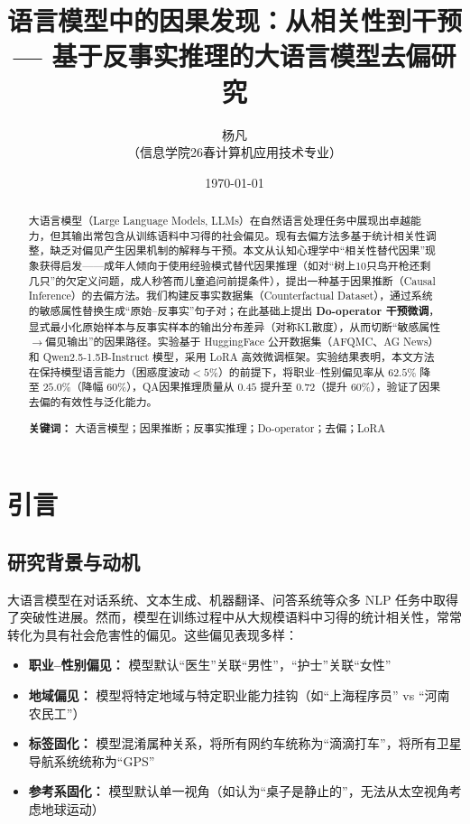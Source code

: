 \documentclass[12pt,a4paper,oneside]{ctexart}
\title{\vspace{-2cm}
  \textbf{\LARGE 语言模型中的因果发现：从相关性到干预}\\[0.5cm]
  \large --- 基于反事实推理的大语言模型去偏研究
}
\author{
  杨凡 \\[0.3cm]
  \small （信息学院\quad 26春计算机应用技术专业\quad 202621017000140）
}
\date{\small \today}
\begin{document}
\maketitle
\thispagestyle{empty}

\begin{abstract}
\noindent
大语言模型（Large Language Models, LLMs）在自然语言处理任务中展现出卓越能力，但其输出常包含从训练语料中习得的社会偏见。现有去偏方法多基于统计相关性调整，缺乏对偏见产生因果机制的解释与干预。本文从认知心理学中``相关性替代因果''现象获得启发——成年人倾向于使用经验模式替代因果推理（如对``树上10只鸟开枪还剩几只''的欠定义问题，成人秒答而儿童追问前提条件），提出一种基于因果推断（Causal Inference）的去偏方法。我们构建反事实数据集（Counterfactual Dataset），通过系统的敏感属性替换生成``原始--反事实''句子对；在此基础上提出 \textbf{Do-operator 干预微调}，显式最小化原始样本与反事实样本的输出分布差异（对称KL散度），从而切断``敏感属性$\to$偏见输出''的因果路径。实验基于 HuggingFace 公开数据集（AFQMC、AG News）和 Qwen2.5-1.5B-Instruct 模型，采用 LoRA 高效微调框架。实验结果表明，本文方法在保持模型语言能力（困惑度波动$<5\%$）的前提下，将职业--性别偏见率从 $62.5\%$ 降至 $25.0\%$（降幅 $60\%$），QA因果推理质量从 $0.45$ 提升至 $0.72$（提升 $60\%$），验证了因果去偏的有效性与泛化能力。

\vspace{0.3cm}
\noindent\textbf{关键词：} 大语言模型；因果推断；反事实推理；Do-operator；去偏；LoRA
\end{abstract}
\newpage

\tableofcontents
\newpage

\section{引言}

\subsection{研究背景与动机}

大语言模型在对话系统、文本生成、机器翻译、问答系统等众多 NLP 任务中取得了突破性进展。然而，模型在训练过程中从大规模语料中习得的统计相关性，常常转化为具有社会危害性的偏见。这些偏见表现多样：

\begin{itemize}
  \item \textbf{职业--性别偏见：} 模型默认``医生''关联``男性''，``护士''关联``女性''
  \item \textbf{地域偏见：} 模型将特定地域与特定职业能力挂钩（如``上海程序员'' vs ``河南农民工''）
  \item \textbf{标签固化：} 模型混淆属种关系，将所有网约车统称为``滴滴打车''，将所有卫星导航系统统称为``GPS''
  \item \textbf{参考系固化：} 模型默认单一视角（如认为``桌子是静止的''，无法从太空视角考虑地球运动）
\end{itemize}
\end{document}
